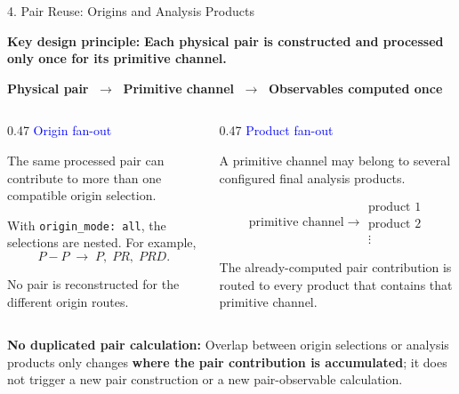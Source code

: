 \documentclass{beamer}
\begin{document}
\begin{frame}{4. Pair Reuse: Origins and Analysis Products}
\fontsize{7.0}{7.7}\selectfont

\begin{center}
\alert{\textbf{Key design principle:}}
\textbf{Each physical pair is constructed and processed only once for its primitive channel.}
\end{center}

\vspace{-0.25em}
\begin{center}
\textbf{Physical pair}
$\;\longrightarrow\;$
\textbf{Primitive channel}
$\;\longrightarrow\;$
\textbf{Observables computed once}
\end{center}

\vspace{0.05em}
\begin{columns}[T]

\begin{column}{0.47\textwidth}
\textcolor{blue}{\Large Origin fan-out}

\smallskip
The same processed pair can contribute to more than one compatible origin selection.

\smallskip
With \texttt{origin\_mode: all}, the selections are nested. For example,
\vspace{-0.25em}
\[
P\!\! -\!\! P \;\longrightarrow\; P,\;PR,\;PRD.
\]
\vspace{-0.45em}

No pair is reconstructed for the different origin routes.
\end{column}

\begin{column}{0.47\textwidth}
\textcolor{blue}{\Large Product fan-out}

\smallskip
A primitive channel may belong to several configured final analysis products.

\vspace{-0.2em}
\[
\text{primitive channel}
\longrightarrow
\begin{matrix}
\text{product 1}\\[-0.15em]
\text{product 2}\\[-0.15em]
\vdots
\end{matrix}
\]
\vspace{-0.4em}

The already-computed pair contribution is routed to every product that contains that primitive channel.
\end{column}

\end{columns}

\vfill
\begin{center}
\alert{\textbf{No duplicated pair calculation:}}
Overlap between origin selections or analysis products only changes \textbf{where the pair contribution is accumulated}; it does not trigger a new pair construction or a new pair-observable calculation.
\end{center}

\end{frame}
\end{document}
